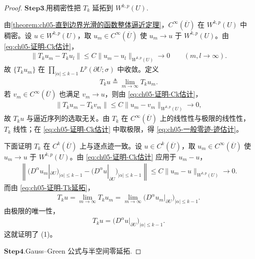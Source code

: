 \documentclass[../../main.tex]{subfiles}%
\begin{document}
\begin{proof}
\noindent$\mathbf{Step}\mathbf{3}.${\heiti 用稠密性把 $T_{k}$ 延拓到 $W^{k,p}(U)$.}

由\cref{theorem:ch05-直到边界光滑的函数整体逼近定理}，$C^{\infty}(\overline{U})$ 在 $W^{k,p}(U)$ 中稠密。设 $u\in W^{k,p}(U)$，取 $u_{m}\in C^{\infty}(\overline{U})$ 使 $u_{m}\to u$ 于 $W^{k,p}(U)$。由 \eqref{eq:ch05-证明-Ck估计}，
\begin{align*}
\|T_{k}u_{m}-T_{k}u_{l}\|
\leqslant C\|u_{m}-u_{l}\|_{W^{k,p}(U)}
\longrightarrow0
\qquad(m,l\to\infty).
\end{align*}
故 $\{T_{k}u_{m}\}$ 在 $\prod_{|\alpha|\leqslant k-1}L^{p}(\partial U;\sigma)$ 中收敛。定义
\begin{align}
T_{k}u\triangleq\lim_{m\to\infty}T_{k}u_{m}.
\label{eq:ch05-证明-Tk延拓}
\end{align}
若 $v_{m}\in C^{\infty}(\overline{U})$ 也满足 $v_{m}\to u$，则由 \eqref{eq:ch05-证明-Ck估计}，
\begin{align*}
\|T_{k}u_{m}-T_{k}v_{m}\|
\leqslant C\|u_{m}-v_{m}\|_{W^{k,p}(U)}
\longrightarrow0,
\end{align*}
故 $T_{k}u$ 与逼近序列的选取无关。由 $T_{k}$ 在 $C^{\infty}(\overline{U})$ 上的线性性与极限的线性性，$T_{k}$ 线性；在 \eqref{eq:ch05-证明-Ck估计} 中取极限，得 \eqref{eq:ch05-一般零迹-迹估计}。

下面证明 $T_{k}$ 在 $C^{k}(\overline{U})$ 上与逐点迹一致。设 $u\in C^{k}(\overline{U})$，取 $u_{m}\in C^{\infty}(\overline{U})$ 使 $u_{m}\to u$ 于 $W^{k,p}(U)$。由 \eqref{eq:ch05-证明-Ck估计} 应用于 $u_{m}-u$，
\begin{align*}
\left\|\bigl(D^{\alpha}u_{m}|_{\partial U}\bigr)_{|\alpha|\leqslant k-1}
-\bigl(D^{\alpha}u|_{\partial U}\bigr)_{|\alpha|\leqslant k-1}\right\|
\leqslant C\|u_{m}-u\|_{W^{k,p}(U)}
\longrightarrow0.
\end{align*}
而由 \eqref{eq:ch05-证明-Tk延拓}，
\begin{align*}
T_{k}u=\lim_{m\to\infty}T_{k}u_{m}
=\lim_{m\to\infty}\bigl(D^{\alpha}u_{m}|_{\partial U}\bigr)_{|\alpha|\leqslant k-1}.
\end{align*}
由极限的唯一性，
\begin{align}
T_{k}u=\bigl(D^{\alpha}u|_{\partial U}\bigr)_{|\alpha|\leqslant k-1}.
\label{eq:ch05-证明-Ck一致}
\end{align}
这就证明了 (1)。

\noindent$\mathbf{Step}\mathbf{4}.${\heiti Gauss--Green 公式与半空间零延拓.}


\end{proof}
\end{document}

